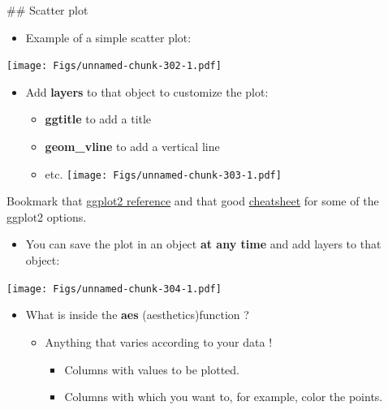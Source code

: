 \documentclass[]{book}
\providecommand{\tightlist}{%
  \setlength{\itemsep}{0pt}\setlength{\parskip}{0pt}}
\begin{document}
\#\# Scatter plot

\begin{itemize}
\tightlist
\item
  Example of a simple scatter plot:
\end{itemize}

\texttt{[image: Figs/unnamed-chunk-302-1.pdf]}

\begin{itemize}
\tightlist
\item
  Add \textbf{layers} to that object to customize the plot:

  \begin{itemize}
  \tightlist
  \item
    \textbf{ggtitle} to add a title
  \item
    \textbf{geom\_vline} to add a vertical line
  \item
    etc.
    \texttt{[image: Figs/unnamed-chunk-303-1.pdf]}
  \end{itemize}
\end{itemize}

Bookmark that \href{https://ggplot2.tidyverse.org/reference/}{ggplot2 reference} and that good \href{https://www.rstudio.com/wp-content/uploads/2016/11/ggplot2-cheatsheet-2.1.pdf}{cheatsheet} for some of the ggplot2 options.

\begin{itemize}
\tightlist
\item
  You can save the plot in an object \textbf{at any time} and add layers to that object:
\end{itemize}

\texttt{[image: Figs/unnamed-chunk-304-1.pdf]}

\begin{itemize}
\tightlist
\item
  What is inside the \textbf{aes} (aesthetics)function ?

  \begin{itemize}
  \tightlist
  \item
    Anything that varies according to your data !

    \begin{itemize}
    \tightlist
    \item
      Columns with values to be plotted.
    \item
      Columns with which you want to, for example, color the points.
    \end{itemize}
  \end{itemize}
\end{itemize}
\end{document}
